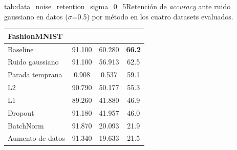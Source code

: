 \begin{table}{tab:data_noise_retention_sigma_0_5}{Retención de \textit{accuracy} ante ruido gaussiano en datos ($\sigma$=0.5) por método en los cuatro datasets evaluados.}
\begin{tabular}{lccc}
\midrule
\multicolumn{4}{l}{\textbf{FashionMNIST}}\\
\midrule
Baseline & 91.100 & 60.280 & \textbf{66.2} \\
Ruido gaussiano & 91.100 & 56.913 & 62.5 \\
Parada temprana & 0.908 & 0.537 & 59.1 \\
L2 & 90.790 & 50.177 & 55.3 \\
L1 & 89.260 & 41.880 & 46.9 \\
Dropout & 91.180 & 41.957 & 46.0 \\
BatchNorm & 91.870 & 20.093 & 21.9 \\
Aumento de datos & 91.340 & 19.633 & 21.5 \\
\bottomrule
\end{tabular}
\end{table}